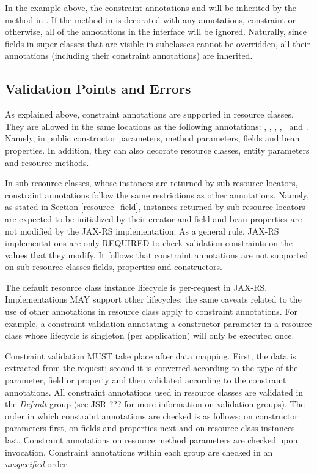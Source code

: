 In the example above, the constraint annotations  and  will be inherited by the  method in . If the  method in  is decorated with any annotations, constraint or otherwise, all of the annotations in the interface  will be ignored. Naturally, since fields in super-classes that are visible in subclasses cannot be overridden, all their annotations (including their constraint annotations) are inherited.

\subsection{Validation Points and Errors}
\label{validation_points_and_errors}

As explained above, constraint annotations are supported in resource classes. They are allowed in the same locations as the following annotations: \MatrixParam, \QueryParam, \PathParam, \CookieParam, \HeaderParam\ and \Context. Namely, in public constructor parameters, method parameters, fields and bean properties. In addition, they can also decorate resource classes, entity parameters and resource methods.

In sub-resource classes, whose instances are returned by sub-resource locators, constraint annotations follow the same restrictions as other annotations. Namely, as stated in Section \ref{resource_field}, instances returned by sub-resource locators are expected to be initialized by their creator and field and bean properties are not modified by the JAX-RS implementation. As a general rule, JAX-RS implementations are only REQUIRED to check validation constraints on the values that they modify. It follows that constraint annotations are not supported on sub-resource classes fields, properties and constructors. 

The default resource class instance lifecycle is per-request in JAX-RS. Implementations MAY support other lifecycles; the same caveats related to the use of other annotations in resource class apply to constraint annotations. For example, a constraint validation annotating a constructor parameter in a resource class whose lifecycle is singleton (per application) will only be executed once.

Constraint validation MUST take place after data mapping. First, the data is extracted from the request; second it is converted according to the type of the parameter, field or property and then validated according to the constraint annotations. All constraint annotations used in resource classes are validated in the \emph{Default} group (see JSR ??? for more information on validation groups). The order in which constraint annotations are checked is as follows: on constructor parameters first, on fields and properties next and on resource class instances last. Constraint annotations on resource method parameters are checked upon invocation. Constraint annotations within each group are checked in an \emph{unspecified} order.


